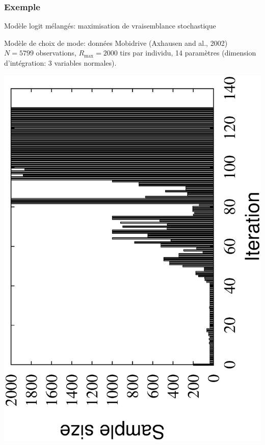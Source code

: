 \documentclass[french]{beamer}
\begin{document}
\begin{frame}
\frametitle{Exemple}

Modèle logit mélangés: maximisation de vraisemblance stochastique
\begin{center}
\end{center}

Modèle de choix de mode: données {\blue Mobidrive} (Axhausen
and al., 2002)\\
$N = 5799$ observations, $R_{\max} = 2000$ tirs par individu, 14
paramètres (dimension d'intégration: 3 variables normales).

\begin{center}
\begin{minipage}{0.49\linewidth}
\includegraphics[angle=270, width=\linewidth]{2000_sample_iter.ps}

\end{minipage}
\end{center}
\end{frame}
\end{document}
